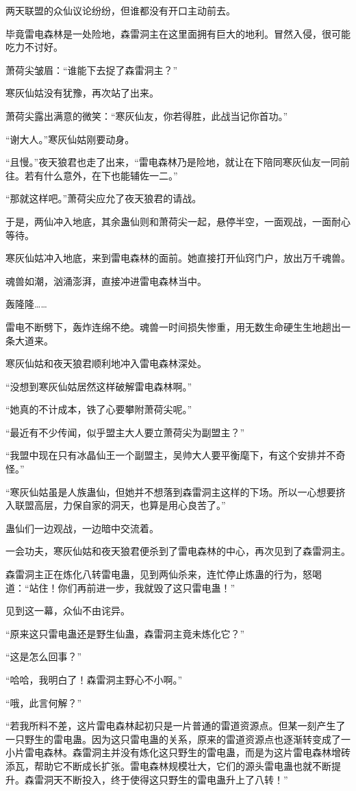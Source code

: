 \begin{this_body}
两天联盟的众仙议论纷纷，但谁都没有开口主动前去。

毕竟雷电森林是一处险地，森雷洞主在这里面拥有巨大的地利。冒然入侵，很可能吃力不讨好。

萧荷尖皱眉：“谁能下去捉了森雷洞主？”

寒灰仙姑没有犹豫，再次站了出来。

萧荷尖露出满意的微笑：“寒灰仙友，你若得胜，此战当记你首功。”

“谢大人。”寒灰仙姑刚要动身。

“且慢。”夜天狼君也走了出来，“雷电森林乃是险地，就让在下陪同寒灰仙友一同前往。若有什么意外，在下也能辅佐一二。”

“那就这样吧。”萧荷尖应允了夜天狼君的请战。

于是，两仙冲入地底，其余蛊仙则和萧荷尖一起，悬停半空，一面观战，一面耐心等待。

寒灰仙姑冲入地底，来到雷电森林的面前。她直接打开仙窍门户，放出万千魂兽。

魂兽如潮，汹涌澎湃，直接冲进雷电森林当中。

轰隆隆……

雷电不断劈下，轰炸连绵不绝。魂兽一时间损失惨重，用无数生命硬生生地趟出一条大道来。

寒灰仙姑和夜天狼君顺利地冲入雷电森林深处。

“没想到寒灰仙姑居然这样破解雷电森林啊。”

“她真的不计成本，铁了心要攀附萧荷尖呢。”

“最近有不少传闻，似乎盟主大人要立萧荷尖为副盟主？”

“我盟中现在只有冰晶仙王一个副盟主，吴帅大人要平衡麾下，有这个安排并不奇怪。”

“寒灰仙姑虽是人族蛊仙，但她并不想落到森雷洞主这样的下场。所以一心想要挤入联盟高层，力保自家的洞天，也算是用心良苦了。”

蛊仙们一边观战，一边暗中交流着。

一会功夫，寒灰仙姑和夜天狼君便杀到了雷电森林的中心，再次见到了森雷洞主。

森雷洞主正在炼化八转雷电蛊，见到两仙杀来，连忙停止炼蛊的行为，怒喝道：“站住！你们再前进一步，我就毁了这只雷电蛊！”

见到这一幕，众仙不由诧异。

“原来这只雷电蛊还是野生仙蛊，森雷洞主竟未炼化它？”

“这是怎么回事？”

“哈哈，我明白了！森雷洞主野心不小啊。”

“哦，此言何解？”

“若我所料不差，这片雷电森林起初只是一片普通的雷道资源点。但某一刻产生了一只野生的雷电蛊。因为这只雷电蛊的关系，原来的雷道资源点也逐渐转变成了一小片雷电森林。森雷洞主并没有炼化这只野生的雷电蛊，而是为这片雷电森林增砖添瓦，帮助它不断成长扩张。雷电森林规模壮大，它们的源头雷电蛊也就不断提升。森雷洞天不断投入，终于使得这只野生的雷电蛊升上了八转！”


\end{this_body}
